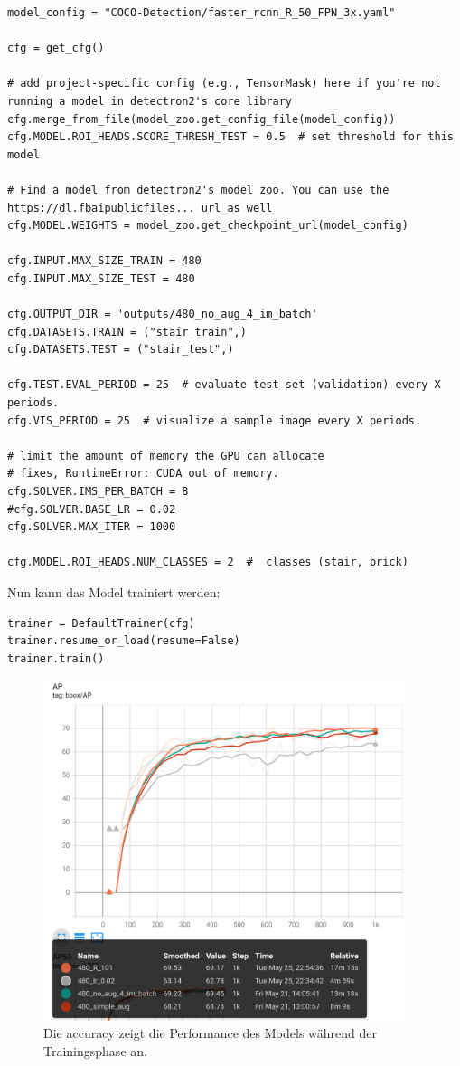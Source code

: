 \begin{verbatim}
model_config = "COCO-Detection/faster_rcnn_R_50_FPN_3x.yaml"

cfg = get_cfg()

# add project-specific config (e.g., TensorMask) here if you're not running a model in detectron2's core library
cfg.merge_from_file(model_zoo.get_config_file(model_config))
cfg.MODEL.ROI_HEADS.SCORE_THRESH_TEST = 0.5  # set threshold for this model

# Find a model from detectron2's model zoo. You can use the https://dl.fbaipublicfiles... url as well
cfg.MODEL.WEIGHTS = model_zoo.get_checkpoint_url(model_config)

cfg.INPUT.MAX_SIZE_TRAIN = 480
cfg.INPUT.MAX_SIZE_TEST = 480

cfg.OUTPUT_DIR = 'outputs/480_no_aug_4_im_batch'
cfg.DATASETS.TRAIN = ("stair_train",)
cfg.DATASETS.TEST = ("stair_test",)

cfg.TEST.EVAL_PERIOD = 25  # evaluate test set (validation) every X periods.
cfg.VIS_PERIOD = 25  # visualize a sample image every X periods.

# limit the amount of memory the GPU can allocate
# fixes, RuntimeError: CUDA out of memory.
cfg.SOLVER.IMS_PER_BATCH = 8
#cfg.SOLVER.BASE_LR = 0.02
cfg.SOLVER.MAX_ITER = 1000

cfg.MODEL.ROI_HEADS.NUM_CLASSES = 2  #  classes (stair, brick)
\end{verbatim}

Nun kann das Model trainiert werden:

\begin{verbatim}
trainer = DefaultTrainer(cfg)
trainer.resume_or_load(resume=False)
trainer.train()
\end{verbatim}


\begin{figure}[H]
  \includegraphics[width=0.95\textwidth]{img/CNN/model-accuracy.png}
  \caption{Die accuracy zeigt die Performance des Models während der Trainingsphase an.}
  \label{fig:model-performance}
\end{figure}

